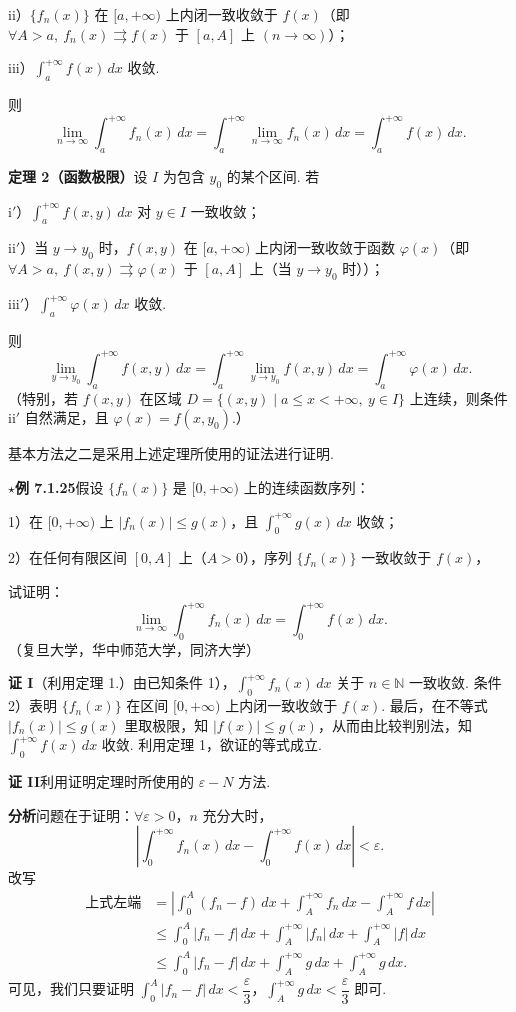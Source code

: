\documentclass[UTF8,12pt,a4paper,fontset=fandol]{ctexart}
\begin{document}
ii）$\{f_n(x)\}$ 在 $[a,+\infty)$ 上内闭一致收敛于 $f(x)$（即 $\forall A>a,\ f_n(x)\rightrightarrows f(x)$ 于 $[a,A]$ 上 $(n\to\infty)$）；

iii）$\displaystyle\int_a^{+\infty}f(x)\,dx$ 收敛.

则
\[
\lim_{n\to\infty}\int_a^{+\infty}f_n(x)\,dx
=\int_a^{+\infty}\lim_{n\to\infty}f_n(x)\,dx
=\int_a^{+\infty}f(x)\,dx.
\]

\noindent\textbf{定理 2（函数极限）}\quad 设 $I$ 为包含 $y_0$ 的某个区间. 若

i$'$）$\displaystyle\int_a^{+\infty}f(x,y)\,dx$ 对 $y\in I$ 一致收敛；

ii$'$）当 $y\to y_0$ 时，$f(x,y)$ 在 $[a,+\infty)$ 上内闭一致收敛于函数 $\varphi(x)$（即 $\forall A>a,\ f(x,y)\rightrightarrows\varphi(x)$ 于 $[a,A]$ 上（当 $y\to y_0$ 时））；

iii$'$）$\displaystyle\int_a^{+\infty}\varphi(x)\,dx$ 收敛.

则
\[
\lim_{y\to y_0}\int_a^{+\infty}f(x,y)\,dx
=\int_a^{+\infty}\lim_{y\to y_0}f(x,y)\,dx
=\int_a^{+\infty}\varphi(x)\,dx.
\]
（特别，若 $f(x,y)$ 在区域 $D=\{(x,y)\mid a\le x<+\infty,\ y\in I\}$ 上连续，则条件 ii$'$ 自然满足，且 $\varphi(x)=f(x,y_0)$.）

基本方法之二是采用上述定理所使用的证法进行证明.

\noindent\textbf{$\star$例 7.1.25}\quad 假设 $\{f_n(x)\}$ 是 $[0,+\infty)$ 上的连续函数序列：

1）在 $[0,+\infty)$ 上 $|f_n(x)|\le g(x)$，且 $\displaystyle\int_0^{+\infty}g(x)\,dx$ 收敛；

2）在任何有限区间 $[0,A]$ 上（$A>0$），序列 $\{f_n(x)\}$ 一致收敛于 $f(x)$，

试证明：
\[
\lim_{n\to\infty}\int_0^{+\infty}f_n(x)\,dx
=\int_0^{+\infty}f(x)\,dx.
\]
（复旦大学，华中师范大学，同济大学）

\noindent\textbf{证 I}\quad （利用定理 1.）由已知条件 1），$\displaystyle\int_0^{+\infty}f_n(x)\,dx$ 关于 $n\in\mathbb{N}$ 一致收敛. 条件 2）表明 $\{f_n(x)\}$ 在区间 $[0,+\infty)$ 上内闭一致收敛于 $f(x)$. 最后，在不等式 $|f_n(x)|\le g(x)$ 里取极限，知 $|f(x)|\le g(x)$，从而由比较判别法，知 $\displaystyle\int_0^{+\infty}f(x)\,dx$ 收敛. 利用定理 1，欲证的等式成立.

\noindent\textbf{证 II}\quad 利用证明定理时所使用的 $\varepsilon-N$ 方法.

\noindent\textbf{分析}\quad 问题在于证明：$\forall\varepsilon>0$，$n$ 充分大时，
\[
\left|\int_0^{+\infty}f_n(x)\,dx-\int_0^{+\infty}f(x)\,dx\right|<\varepsilon.
\]
改写
\[
\begin{aligned}
\text{上式左端}
&=\left|\int_0^A(f_n-f)\,dx+\int_A^{+\infty}f_n\,dx-\int_A^{+\infty}f\,dx\right|\\
&\le\int_0^A|f_n-f|\,dx+\int_A^{+\infty}|f_n|\,dx+\int_A^{+\infty}|f|\,dx\\
&\le\int_0^A|f_n-f|\,dx+\int_A^{+\infty}g\,dx+\int_A^{+\infty}g\,dx.
\end{aligned}
\]
可见，我们只要证明 $\displaystyle\int_0^A|f_n-f|\,dx<\dfrac{\varepsilon}{3}$，$\displaystyle\int_A^{+\infty}g\,dx<\dfrac{\varepsilon}{3}$ 即可.
\end{document}
